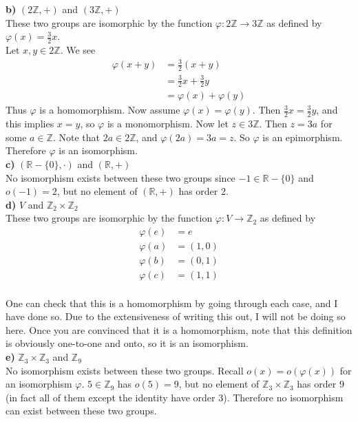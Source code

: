 \documentclass{scrartcl}
\begin{document}
\textbf{b)} $(2\mathbb{Z},+)$ and $(3\mathbb{Z},+)$\\

These two groups are isomorphic by the function $\varphi : 2\mathbb{Z}
\rightarrow 3\mathbb{Z}$ as defined by $\varphi(x) = \frac{3}{2}x$.\\
Let $x,y \in 2\mathbb{Z}$. We see 
\begin{align*}
\varphi(x+y) &= \frac{3}{2}(x+y)\\
             &= \frac{3}{2}x + \frac{3}{2}y\\
             &= \varphi(x) + \varphi(y)
\end{align*}
Thus $\varphi$ is a homomorphism. Now assume $\varphi(x)=\varphi(y)$. Then
$\frac{3}{2}x=\frac{3}{2}y$, and this implies $x=y$, so $\varphi$ is a
monomorphism. Now let $z \in 3\mathbb{Z}$. Then $z = 3a$ for some
$a \in \mathbb{Z}$. Note that $2a \in 2\mathbb{Z}$, and $\varphi(2a)=3a=z$.
So $\varphi$ is an epimorphism. Therefore $\varphi$ is an isomorphism.\\

\textbf{c)} $(\mathbb{R}-\{0\},\cdot)$ and $(\mathbb{R},+)$\\
No isomorphism exists between these two groups since $-1 \in \mathbb{R} - \{0\}$
and $o(-1) = 2$, but no element of $(\mathbb{R},+)$ has order 2.\\

\textbf{d)} $V$ and $\mathbb{Z}_2 \times \mathbb{Z}_2$\\
These two groups are isomorphic by the function $\varphi : V \rightarrow \mathbb{Z}_2$ as defined by
\begin{align*}
\varphi(e) &= e\\
\varphi(a) &= (1,0)\\
\varphi(b) &= (0,1)\\
\varphi(c) &= (1,1)
\end{align*}\\
One can check that this is a homomorphism by going through each case, and I have
done so. Due to the extensiveness of writing this out, I will not be doing so
here. Once you are convinced that it is a homomorphism, note that this
definition is obviously one-to-one and onto, so it is an isomorphism.\\

\textbf{e)} $\mathbb{Z}_3 \times \mathbb{Z}_3$ and $\mathbb{Z}_9$\\
No isomorphism exists between these two groups. Recall $o(x)=o(\varphi(x))$ for
an isomorphism $\varphi$. $5 \in \mathbb{Z}_9$ has $o(5)=9$, but no element of
$\mathbb{Z}_3 \times \mathbb{Z}_3$ has order 9 (in fact all of them except the
identity have order 3). Therefore no isomorphism can exist between these two
groups.\\
\end{document}
